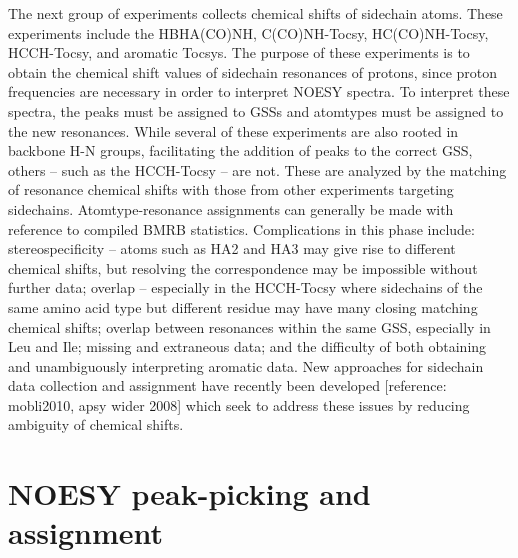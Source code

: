 The next group of experiments collects chemical shifts of sidechain atoms.  
These experiments include the HBHA(CO)NH, C(CO)NH-Tocsy, HC(CO)NH-Tocsy, 
HCCH-Tocsy, and aromatic Tocsys.  The purpose of these experiments is to 
obtain the chemical shift values of sidechain resonances of protons, since 
proton frequencies are necessary in order to interpret NOESY spectra.  To 
interpret these spectra, the peaks must be assigned to GSSs and atomtypes 
must be assigned to the new resonances. While several of these experiments 
are also rooted in backbone H-N groups, facilitating the addition of peaks 
to the correct GSS, others -- such as the HCCH-Tocsy -- are not.  These are 
analyzed by the matching of resonance chemical shifts with those from other 
experiments targeting sidechains.  Atomtype-resonance assignments can generally 
be made with reference to compiled BMRB statistics.  Complications in this 
phase include: stereospecificity -- atoms such as HA2 and HA3 may give rise 
to different chemical shifts, but resolving the correspondence may be 
impossible without further data; overlap -- especially in the HCCH-Tocsy 
where sidechains of the same amino acid type but different residue may have 
many closing matching chemical shifts; overlap between resonances within the 
same GSS, especially in Leu and Ile; missing and extraneous data; and the 
difficulty of both obtaining and unambiguously interpreting aromatic data.  
New approaches for sidechain data collection and assignment have recently 
been developed [reference: mobli2010, apsy wider 2008] which seek to address 
these issues by reducing ambiguity of chemical shifts.


\section{NOESY peak-picking and assignment}

